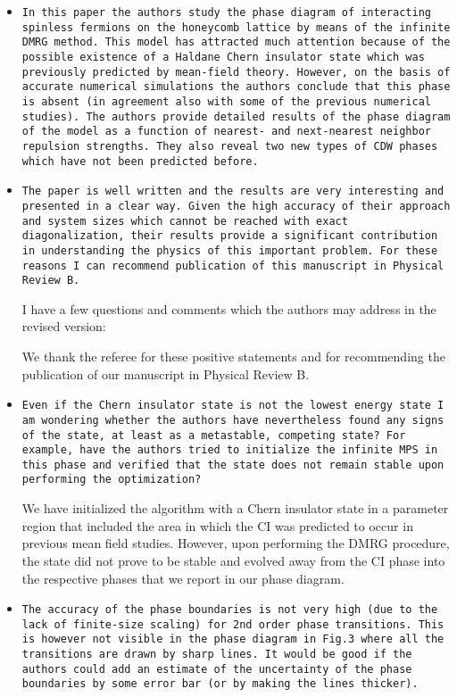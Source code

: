 \documentclass[aps,prb,superscriptaddress]{revtex4}
\begin{document}
\begin{itemize}

\item{\tt In this paper the authors study the phase diagram of interacting
spinless fermions on the honeycomb lattice by means of the infinite
DMRG method. This model has attracted much attention because of the
possible existence of a Haldane Chern insulator state which was
previously predicted by mean-field theory. However, on the basis of
accurate numerical simulations the authors conclude that this phase is
absent (in agreement also with some of the previous numerical
studies). The authors provide detailed results of the phase diagram of
the model as a function of nearest- and next-nearest neighbor
repulsion strengths. They also reveal two new types of CDW phases
which have not been predicted before.}

\item{\tt The paper is well written and the results are very interesting and
presented in a clear way. Given the high accuracy of their approach
and system sizes which cannot be reached with exact diagonalization,
their results provide a significant contribution in understanding the
physics of this important problem. For these reasons I can recommend
publication of this manuscript in Physical Review B.

I have a few questions and comments which the authors may address in
the revised version:}

We thank the referee for these positive statements and for recommending the publication of our manuscript in Physical Review B. 


\item{\tt Even if the Chern insulator state is not the lowest energy state I
am wondering whether the authors have nevertheless found any signs of
the state, at least as a metastable, competing state? For example,
have the authors tried to initialize the infinite MPS in this phase
and verified that the state does not remain stable upon performing the
optimization?}

We have initialized the algorithm with a Chern insulator state in a parameter region that included the area in which the CI was predicted to occur in previous mean field studies. However, upon performing the DMRG procedure, the state did not prove to be stable and evolved away from the CI phase into the respective phases that we report in our phase diagram.
 
\item{\tt The accuracy of the phase boundaries is not very high (due to the
lack of finite-size scaling) for 2nd order phase transitions. This is
however not visible in the phase diagram in Fig.3 where all the
transitions are drawn by sharp lines. It would be good if the authors
could add an estimate of the uncertainty of the phase boundaries by
some error bar (or by making the lines thicker).}


\end{itemize}
\end{document}
